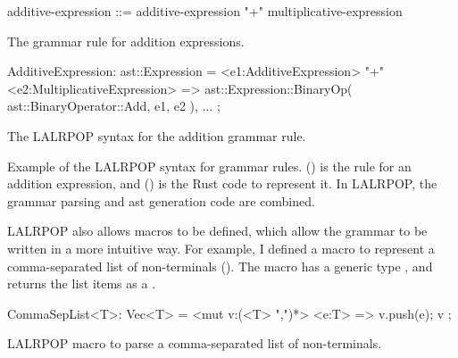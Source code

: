 \documentclass[00-main.tex]{subfiles}
\begin{document}
\begin{listing}[t]
  \begin{sublisting}[t]{\textwidth}
    \begin{GrammarListing}
      additive-expression ::= additive-expression "+" multiplicative-expression
    \end{GrammarListing}
    \caption{The grammar rule for addition expressions.}
    \label{sublst:addition expr grammar rule}
  \end{sublisting}
  \par\medskip %
  \begin{sublisting}[t]{\textwidth}
    \begin{RustListing}
      AdditiveExpression: ast::Expression = {
          <e1:AdditiveExpression> "+" <e2:MultiplicativeExpression>
              => ast::Expression::BinaryOp(
                  ast::BinaryOperator::Add,
                  e1,
                  e2
              ),
          ...
      };
    \end{RustListing}
    \caption{The LALRPOP syntax for the addition grammar rule.}
    \label{sublst:lalrpop syntax addition rule}
  \end{sublisting}
  \caption{
    Example of the LALRPOP syntax for grammar rules.
    () is the rule for an addition expression, and () is the Rust code to represent it.
    In LALRPOP, the grammar parsing and \gls{ast} generation code are combined.
  }
  \label{lst:AST generation code example}
\end{listing}

LALRPOP also allows macros to be defined, which allow the grammar to be written in a more intuitive way.
For example, I defined a macro to represent a comma-separated list of non-terminals ().
The macro has a generic type , and returns the list items as a .

\begin{listing}[t]
  \begin{RustListing}
    CommaSepList<T>: Vec<T> = {
        <mut v:(<T> ",")*> <e:T> => {
            v.push(e);
            v
        }
    };
  \end{RustListing}
  \caption{LALRPOP macro to parse a comma-separated list of non-terminals.}
  \label{lst:parser macro for comma-separated list}
\end{listing}
\end{document}
